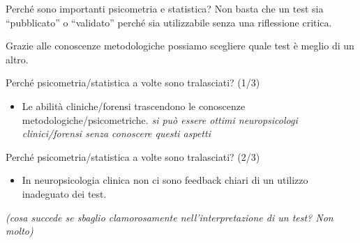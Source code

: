 \documentclass[
  ignorenonframetext,
]{beamer}
\providecommand{\tightlist}{%
  \setlength{\itemsep}{0pt}\setlength{\parskip}{0pt}}
\begin{document}
\begin{frame}{Perché sono importanti psicometria e statistica?}
\label{perchuxe9-sono-importanti-psicometria-e-statistica}
Non basta che un test sia ``pubblicato'' o ``validato'' perché sia
utilizzabile senza una riflessione critica.

\vspace{2em}

Grazie alle conoscenze metodologiche possiamo scegliere quale test è
meglio di un altro.

\pause
\vspace{2em}

\begin{center}
\end{center}
\end{frame}

\begin{frame}{Perché psicometria/statistica a volte sono tralasciati?
(1/3)}
\label{perchuxe9-psicometriastatistica-a-volte-sono-tralasciati-13}
\begin{itemize}
\tightlist
\item
  Le abilità cliniche/forensi trascendono le conoscenze
  metodologiche/psicometriche. \emph{si può essere ottimi neuropsicologi
  clinici/forensi senza conoscere questi aspetti}
\end{itemize}
\end{frame}

\begin{frame}{Perché psicometria/statistica a volte sono tralasciati?
(2/3)}
\label{perchuxe9-psicometriastatistica-a-volte-sono-tralasciati-23}
\begin{itemize}
\tightlist
\item
  In neuropsicologia clinica non ci sono feedback chiari di un utilizzo
  inadeguato dei test.
\end{itemize}

\emph{(cosa succede se sbaglio clamorosamente nell'interpretazione di un
test? Non molto)}
\end{frame}
\end{document}

